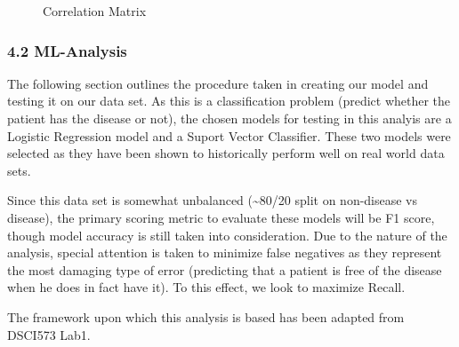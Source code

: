 \documentclass[
  letterpaper,
  DIV=11,
  numbers=noendperiod]{scrartcl}
\begin{document}
\begin{figure}


\caption{\label{fig-cor-mat}Correlation Matrix}

\end{figure}%

\subsubsection{4.2 ML-Analysis}\label{ml-analysis}

The following section outlines the procedure taken in creating our model
and testing it on our data set. As this is a classification problem
(predict whether the patient has the disease or not), the chosen models
for testing in this analyis are a Logistic Regression model and a Suport
Vector Classifier. These two models were selected as they have been
shown to historically perform well on real world data sets.

Since this data set is somewhat unbalanced (\textasciitilde80/20 split
on non-disease vs disease), the primary scoring metric to evaluate these
models will be F1 score, though model accuracy is still taken into
consideration. Due to the nature of the analysis, special attention is
taken to minimize false negatives as they represent the most damaging
type of error (predicting that a patient is free of the disease when he
does in fact have it). To this effect, we look to maximize Recall.

The framework upon which this analysis is based has been adapted from
DSCI573 Lab1.
\end{document}
